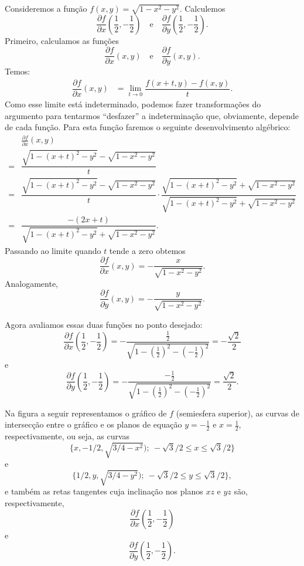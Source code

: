 \begin{example}{}{}
Consideremos a função $f(x,y)=\sqrt{1-x^2-y^2}$. Calculemos 
$$\frac{\partial f}{\partial x}\left(\frac{1}{2},-\frac{1}{2}\right)\quad \mbox{e}\quad \frac{\partial f}{\partial y}\left(\frac{1}{2},-\frac{1}{2}\right).$$ 
Primeiro, calculamos as funções 
$$\frac{\partial f}{\partial x}\left(x,y\right)\quad \mbox{e}\quad \frac{\partial f}{\partial y}\left(x,y\right).$$ 
Temos:
\begin{align*}
    \dfrac{\partial f}{\partial x}(x,y)&=\lim_{t\rightarrow 0}\dfrac{f(x+t,y)-f(x,y)}{t}.
\end{align*}
Como esse limite está indeterminado, podemos fazer transformações do argumento para tentarmos ``desfazer'' a indeterminação que, obviamente, depende de cada função. Para esta função faremos o seguinte desenvolvimento algébrico:
\begin{align*}
    &\frac{\partial f}{\partial x}(x,y)\\[.5em]
    =&\dfrac{\sqrt{1-(x+t)^2-y^2}-\sqrt{1-x^2-y^2}}{t}\\[.5em]
    =&\dfrac{\sqrt{1-(x+t)^2-y^2}-\sqrt{1-x^2-y^2}}{t}\cdot \dfrac{\sqrt{1-(x+t)^2-y^2}+\sqrt{1-x^2-y^2}}{\sqrt{1-(x+t)^2-y^2}+\sqrt{1-x^2-y^2}}\\
    =&\dfrac{-(2x+t)}{\sqrt{1-(x+t)^2-y^2}+\sqrt{1-x^2-y^2}}.
\end{align*}
Passando ao limite quando $t$ tende a zero obtemos
$$\dfrac{\partial f}{\partial x}(x,y)=-\dfrac{x}{\sqrt{1-x^2-y^2}}.$$
Analogamente,
$$\dfrac{\partial f}{\partial y}(x,y)=-\dfrac{y}{\sqrt{1-x^2-y^2}}.$$

Agora avaliamos essas duas funções no ponto desejado: 
$$\frac{\partial f}{\partial x}\left(\frac{1}{2},-\frac{1}{2}\right)=-\dfrac{\frac{1}{2}}{\sqrt{1-\left(\frac{1}{2}\right)^2-\left(-\frac{1}{2}\right)^2}}=-\dfrac{\sqrt{2}}{2}$$
e
$$\frac{\partial f}{\partial y}\left(\frac{1}{2},-\frac{1}{2}\right)=-\dfrac{-\frac{1}{2}}{\sqrt{1-\left(\frac{1}{2}\right)^2-\left(-\frac{1}{2}\right)^2}}=\dfrac{\sqrt{2}}{2}.$$

Na figura a seguir representamos o gráfico de $f$ (semiesfera superior), as curvas de intersecção entre o gráfico e os planos de equação $y=-\frac{1}{2}$ e $x=\frac{1}{2}$, respectivamente, ou seja, as curvas
$$\{x,-1/2,\sqrt{3/4-x^2});~-\sqrt{3}/2\leq x\leq  \sqrt{3}/2\}$$
e
$$\{1/2,y,\sqrt{3/4-y^2});~-\sqrt{3}/2\leq y\leq  \sqrt{3}/2\},$$
e também as retas tangentes cuja inclinação nos planos $xz$ e $yz$ são, respectivamente, 
$$\frac{\partial f}{\partial x}\left(\frac{1}{2},-\frac{1}{2}\right)$$
e
$$\frac{\partial f}{\partial y}\left(\frac{1}{2},-\frac{1}{2}\right).$$
\begin{figure}[H]
    \centering
{} %




\end{figure}
\end{example}
